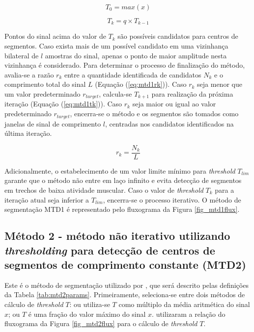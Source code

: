 \begin{equation}
\label{eq:mtd1t0}
  T_0 = max(x)
\end{equation}

\begin{equation}
\label{eq:mtd1tk}
  T_k = q \times T_{k-1}
\end{equation}

Pontos do sinal acima do valor de $T_k$ são possíveis candidatos para centros de segmentos. Caso exista mais de um possível candidato em uma vizinhança bilateral de $l$ amostras do sinal, apenas o ponto de maior amplitude nesta vizinhança é considerado. Para determinar o processo de finalização do método, avalia-se a razão $r_k$ entre a quantidade identificada de candidatos $N_{k}$ e o comprimento total do sinal $L$ (Equação (\ref{eq:mtd1rk})). Caso $r_k$ seja menor que um valor predeterminado $r_{target}$, calcula-se $T_{k+1}$ para realização da próxima iteração (Equação (\ref{eq:mtd1tk})). Caso $r_k$ seja maior ou igual ao valor predeterminado $r_{target}$, encerra-se o método e os segmentos são tomados como janelas de sinal de comprimento $l$, centradas nos candidatos identificados na última iteração.

\begin{equation}
\label{eq:mtd1rk}
  r_k = \frac{N_{k}}{L} 
\end{equation}

Adicionalmente, o estabelecimento de um valor limite mínimo para \emph{threshold} $T_{lim}$ garante que o método não entre em laço infinito e evita detecção de segmentos em trechos de baixa atividade muscular. Caso o valor de \emph{threshold} $T_k$ para a iteração atual seja inferior a $T_{lim}$, encerra-se o processo iterativo. O método de segmentação MTD1 é representado pelo fluxograma da Figura \ref{fig_mtd1flux}.



			\subsection{Método 2 - método não iterativo utilizando \emph{thresholding} para detecção de centros de segmentos de comprimento constante (MTD2)}
Este é o método de segmentação utilizado por \cite{Katsis2006}, que será descrito pelas definições da Tabela \ref{tab:mtd2params}. Primeiramente, seleciona-se entre dois métodos de cálculo de \emph{threshold} $T$: ou utiliza-se $T$ como múltiplo da média aritmética do sinal $x$; ou $T$ é uma fração do valor máximo do sinal $x$. \cite{Katsis2006} utilizaram a relação do fluxograma da Figura \ref{fig_mtd2flux} para o cálculo de \emph{threshold} $T$.


